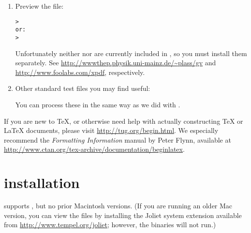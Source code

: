\documentclass{article}
\begin{document}
\begin{enumerate}
\item Preview the  file:
\begin{alltt}
> 
\textrm{or:}
> 
\end{alltt}
Unfortunately neither  nor  are currently
included in \TeXLive{}, so you must install them separately.  See
\url{http://wwwthep.physik.uni-mainz.de/~plass/gv} and
\url{http://www.foolabs.com/xpdf}, respectively.

\item Other standard test files you may find useful:

You can process these in the same way as we did with
.

\end{enumerate}

If you are new to \TeX{}, or otherwise need help with actually
constructing \TeX{} or \LaTeX{} documents, please visit
\url{http://tug.org/begin.html}.  We especially recommend the
\textsl{Formatting Information} manual by Peter Flynn, available at
\url{http://www.ctan.org/tex-archive/documentation/beginlatex}.


\section{\MacOSX{} installation}
\label{sec:mac-install}

\TeXLive{} supports \MacOSX, but no prior Macintosh versions.  (If you
are running an older Mac version, you can view the files by installing
the Joliet system extension available from
\url{http://www.tempel.org/joliet}; however, the \TeXLive{} binaries
will not run.)
\end{document}
